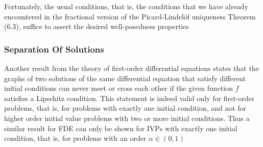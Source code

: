 Fortunately, the usual conditions, that is, the conditions that we have already encountered
in the fractional version of the Picard-Lindelöf uniqueness Theorem (6.3), 
suffice to assert the desired well-posedness properties


\subsubsection{Separation Of Solutions}
Another result from the theory of first-order differential equations states that
the graphs of two solutions of the same differential equation that satisfy different initial
conditions can never meet or cross each other if the given function $f$ satisfies a Lipschitz
condition. This statement is indeed valid only for first-order problems, that is,
for problems with exactly one initial condition, and not for higher order initial value
problems with two or more initial conditions. Thus a similar result for FDE can only be shown 
for IVPs with exactly one initial condition, that is, for problems with an order $\alpha \in (0, 1)$

